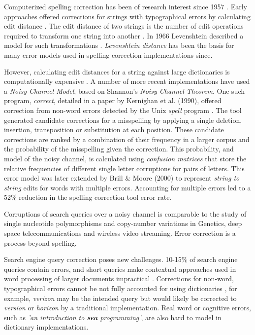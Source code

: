 \documentclass{csfourzero}
\begin{document}
Computerized spelling correction has been of research interest since 1957 \cite{jameslpeterson1980beginning}. Early approaches offered corrections for strings with typographical errors by calculating edit distance \cite{1992correctiondiscussion}. The edit distance of two strings is the number of edit operations required to transform one string into another \cite{introIR}. In 1966 Levenshtein described a model for such transformations \cite{levenshtein1966binary}. \textit{Levenshtein distance} has been the basis for many error models used in spelling correction implementations since.

However, calculating edit distances for a string against large dictionaries is computationally expensive \cite{2009adaptivespellchecker}. A number of more recent implementations have used a \textit{Noisy Channel Model}, based on Shannon's \textit{Noisy Channel Theorem}. One such program, \textit{correct}, detailed in a paper by Kernighan et al. (1990), offered correction from non-word errors detected by the Unix \textit{spell} program \cite{originalnoisychannel}. The tool generated candidate corrections for a misspelling by applying a single deletion, insertion, transposition or substitution at each position. These candidate corrections are ranked by a combination of their frequency in a larger corpus and the probability of the misspelling given the correction. This probability, and model of the noisy channel, is calculated using \textit{confusion matrices} that store the relative frequencies of different single letter corruptions for pairs of letters. This error model was later extended by Brill \& Moore (2000) \cite{betternoisychannel} to represent \textit{string to string} edits for words with multiple errors. Accounting for multiple errors led to a 52\% reduction in the spelling correction tool error rate.

Corruptions of search queries over a noisy channel is comparable to the study of single nucleotide polymorphisms and copy-number variations in Genetics, deep space telecommunications and wireless video streaming. Error correction is a process beyond spelling.

Search engine query correction poses new challenges. 10-15\% of search engine queries contain errors, and short queries make contextual approaches used in word processing of larger documents impractical \cite{webuserpoweredspelling}. Corrections for non-word, typographical errors cannot be not fully accounted for using dictionaries \cite{webuser3}, for example, \textit{verizon} may be the intended query but would likely be corrected to \textit{version} or \textit{horizon} by a traditional implementation. Real word or cognitive errors, such as \textit{'an introduction to \textbf{sea} programming'}, are also hard to model in dictionary implementations.
\end{document}
